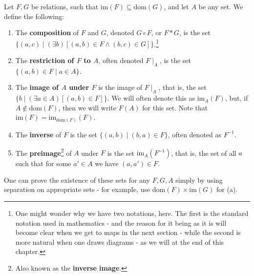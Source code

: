 \begin{defn}
\label{Defn:_inverses_composition_etc_for_relations}
Let $F, G$ be relations, such that $\text{im}(F)\subseteq\text{dom}(G)$, and let $A$ be any set. We define the following:

\begin{enumerate}[label = (\alph*)]
\item The \textbf{composition} of $F$ and $G$, denoted $G\circ F$, or $F\ast G$, is the set $\{(a, c)\mid (\exists b)[(a, b)\in F \land (b, c)\in G]\}$.\footnote{One might wonder why we have two notations, here. The first is the standard notation used in mathematics - and the reason for it being as it is will become clear when we get to maps in the next section - while the second is more natural when one draws diagrams - as we will at the end of this chapter.}

\item The \textbf{restriction of $F$ to $A$}, often denoted $F\mid_A$, is the set $\{(a, b)\in F \mid a\in A\}$.

\item The \textbf{image of $A$ under $F$} is the image of $F\mid_A$, that is, the set $\{b\mid (\exists a\in A)[(a, b)\in F]\}$. We will often denote this as $\text{im}_A(F)$, but, if $A\notin \text{dom}(F)$, then we will write $F(A)$ for this set. Note that $\text{im}(F)=\text{im}_{\text{dom}(F)}(F)$.

\item The \textbf{inverse} of $F$ is the set $\{(a, b)\mid (b, a)\in F\}$, often denoted as $F^{-1}$.

\item The \textbf{preimage}\footnote{Also known as the \textbf{inverse image}.} of $A$ under $F$ is the set $\text{im}_A(F^{-1})$, that is, the set of all $a$ such that for some $a'\in A$ we have $(a, a')\in F$. 

\end{enumerate}

One can prove the existence of these sets for any $F, G, A$ simply by using separation on appropriate sets - for example, use $\text{dom}(F)\times \text{im}(G)$ for (a). 
\end{defn}
